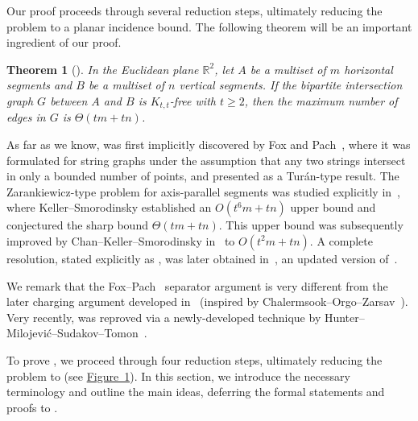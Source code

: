 \documentclass[11pt]{article}
\newtheorem{theorem}{Theorem}[section]
\theoremstyle{definition}
\newcommand*{\R}{\mathbb{R}}                                    %
\begin{document}
Our proof proceeds through several reduction steps, ultimately reducing the problem to a planar incidence bound.
The following theorem will be an important ingredient of our proof.

\begin{theorem}[{\cite[Theorem 1.5]{fox_pach}}] \label{thm:CKS}
    In the Euclidean plane $\R^2$, let $A$ be a multiset of $m$ horizontal segments and $B$ be a multiset of $n$ vertical segments. If the bipartite intersection graph $G$ between $A$ and $B$ is $K_{t, t}$-free with $t \ge 2$, then the maximum number of edges in $G$ is $\Theta(tm + tn)$. 
\end{theorem}

As far as we know,  was first implicitly discovered by Fox and Pach~\cite{fox_pach}, where it was formulated for string graphs under the assumption that any two strings intersect in only a bounded number of points, and presented as a Turán-type result. The Zarankiewicz-type problem for axis-parallel segments was studied explicitly in~\cite{keller_smorodinsky}, where Keller--Smorodinsky established an $O(t^6 m + tn)$ upper bound and conjectured the sharp bound $\Theta(tm + tn)$. This upper bound was subsequently improved by Chan--Keller--Smorodinsky in~\cite{chan_keller_smorodinsky} to $O(t^2 m + tn)$. A complete resolution, stated explicitly as , was later obtained in~\cite{chan_keller_smorodinsky_arxiv}, an updated version of~\cite{chan_keller_smorodinsky}. 

We remark that the Fox--Pach~\cite{fox_pach} separator argument is very different from the later charging argument developed in~\cite{chan_keller_smorodinsky_arxiv} (inspired by Chalermsook--Orgo--Zarsav~\cite{chalermsook_orgo_zarsav}).
Very recently,  was reproved via a newly-developed technique by Hunter--Milojević--Sudakov--Tomon~\cite{hunter_milojevic_sudakov_tomon}.

To prove , we proceed through four reduction steps, ultimately reducing the problem to  (see \hyperlink{figone}{Figure~1}). In this section, we introduce the necessary terminology and outline the main ideas, deferring the formal statements and proofs to .
\end{document}
